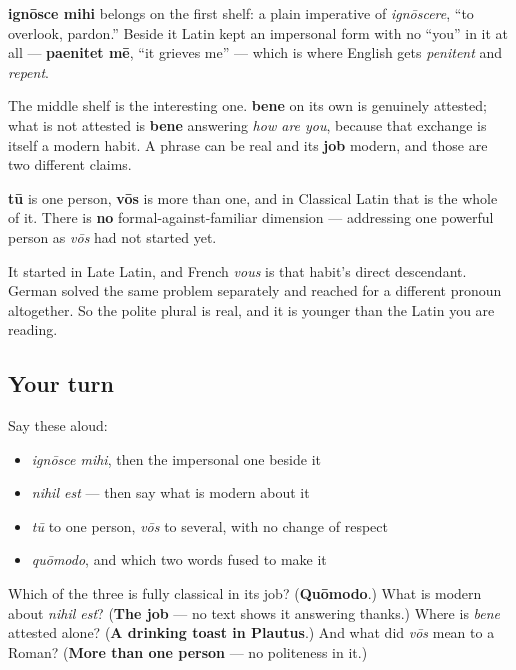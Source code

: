 \textbf{ignōsce mihi} belongs on the first shelf: a plain imperative of \emph{ignōscere}, \textquotedblleft{}to overlook, pardon.\textquotedblright{} Beside it Latin kept an impersonal form with no \textquotedblleft{}you\textquotedblright{} in it at all — \textbf{paenitet mē}, \textquotedblleft{}it grieves me\textquotedblright{} — which is where English gets \emph{penitent} and \emph{repent}.

The middle shelf is the interesting one. \textbf{bene} on its own is genuinely attested; what is not attested is \textbf{bene} answering \emph{how are you}, because that exchange is itself a modern habit. A phrase can be real and its \textbf{job} modern, and those are two different claims.

\begin{culture}
\textbf{tū} is one person, \textbf{vōs} is more than one, and in Classical Latin that is the whole of it. There is \textbf{no} formal-against-familiar dimension — addressing one powerful person as \emph{vōs} had not started yet.

It started in Late Latin, and French \emph{vous} is that habit's direct descendant. German solved the same problem separately and reached for a different pronoun altogether. So the polite plural is real, and it is younger than the Latin you are reading.
\end{culture}

\subsection*{Your turn}
Say these aloud:

\begin{itemize}
\raggedright
  \item \emph{ignōsce mihi}, then the impersonal one beside it
  \item \emph{nihil est} — then say what is modern about it
  \item \emph{tū} to one person, \emph{vōs} to several, with no change of respect
  \item \emph{quōmodo}, and which two words fused to make it
\end{itemize}

\begin{tcolorbox}[breakable,colback=teal!4,colframe=teal!35!black,title={Before you move on}]
Which of the three is fully classical in its job? (\textbf{Quōmodo}.) What is modern about \emph{nihil est}? (\textbf{The job} — no text shows it answering thanks.) Where is \emph{bene} attested alone? (\textbf{A drinking toast in Plautus}.) And what did \emph{vōs} mean to a Roman? (\textbf{More than one person} — no politeness in it.)
\end{tcolorbox}
